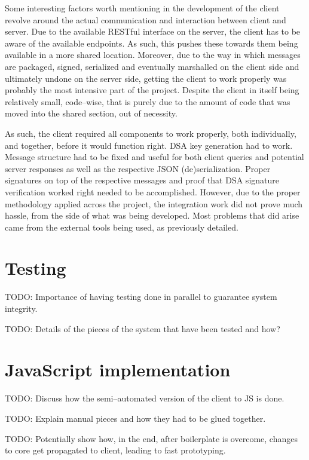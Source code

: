 Some interesting factors worth mentioning in the development of the client revolve around the actual communication and interaction between client and server.
Due to the available RESTful interface on the server, the client has to be aware of the available endpoints.
As such, this pushes these towards them being available in a more shared location.
Moreover, due to the way in which messages are packaged, signed, serialized and eventually marshalled on the client side and ultimately undone on the server side, getting the client to work properly was probably the most intensive part of the project.
Despite the client in itself being relatively small, code--wise, that is purely due to the amount of code that was moved into the shared section, out of necessity.

As such, the client required all components to work properly, both individually, and together, before it would function right.
DSA key generation had to work.
Message structure had to be fixed and useful for both client queries and potential server responses as well as the respective JSON (de)serialization.
Proper signatures on top of the respective messages and proof that DSA signature verification worked right needed to be accomplished.
However, due to the proper methodology applied across the project, the integration work did not prove much hassle, from the side of what was being developed.
Most problems that did arise came from the external tools being used, as previously detailed.

\section{Testing}
TODO: Importance of having testing done in parallel to guarantee system integrity.

TODO: Details of the pieces of the system that have been tested and how?

\section{JavaScript implementation}
TODO: Discuss how the semi--automated version of the client to JS is done.

TODO: Explain manual pieces and how they had to be glued together.

TODO: Potentially show how, in the end, after boilerplate is overcome, changes to core get propagated to client, leading to fast prototyping.
